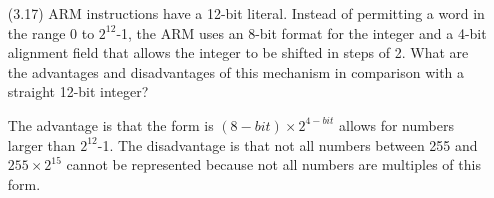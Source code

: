 \documentclass[letterpaper,10pt,titlepage]{article}
\begin{document}
\begin{enumerate}
	\item[(3.17)] ARM instructions have a 12-bit literal. Instead of permitting a word
		in the range 0 to $2^{12}$-1, the ARM uses an 8-bit format for the integer
		and a 4-bit alignment field that allows the integer to be shifted in steps
		of 2. What are the advantages and disadvantages of this mechanism in
		comparison with a straight 12-bit integer?
	\item[\textbullet] The advantage is that the form is $(8-bit) \times  2^{4-bit}$ 
		allows for numbers larger than $2^{12}$-1. The disadvantage is that
		not all numbers between 255 and $255 \times 2^{15}$ cannot be represented 
		because not all numbers are multiples of this form.

%
%

\end{enumerate}
\end{document}

